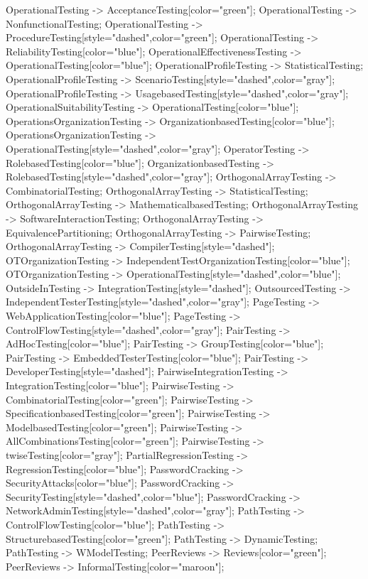 \documentclass{article}
\begin{document}
{OperationalTesting -> AcceptanceTesting[color="green"];
OperationalTesting -> NonfunctionalTesting;
OperationalTesting -> ProcedureTesting[style="dashed",color="green"];
OperationalTesting -> ReliabilityTesting[color="blue"];
OperationalEffectivenessTesting -> OperationalTesting[color="blue"];
OperationalProfileTesting -> StatisticalTesting;
OperationalProfileTesting -> ScenarioTesting[style="dashed",color="gray"];
OperationalProfileTesting -> UsagebasedTesting[style="dashed",color="gray"];
OperationalSuitabilityTesting -> OperationalTesting[color="blue"];
OperationsOrganizationTesting -> OrganizationbasedTesting[color="blue"];
OperationsOrganizationTesting -> OperationalTesting[style="dashed",color="gray"];
OperatorTesting -> RolebasedTesting[color="blue"];
OrganizationbasedTesting -> RolebasedTesting[style="dashed",color="gray"];
OrthogonalArrayTesting -> CombinatorialTesting;
OrthogonalArrayTesting -> StatisticalTesting;
OrthogonalArrayTesting -> MathematicalbasedTesting;
OrthogonalArrayTesting -> SoftwareInteractionTesting;
OrthogonalArrayTesting -> EquivalencePartitioning;
OrthogonalArrayTesting -> PairwiseTesting;
OrthogonalArrayTesting -> CompilerTesting[style="dashed"];
OTOrganizationTesting -> IndependentTestOrganizationTesting[color="blue"];
OTOrganizationTesting -> OperationalTesting[style="dashed",color="blue"];
OutsideInTesting -> IntegrationTesting[style="dashed"];
OutsourcedTesting -> IndependentTesterTesting[style="dashed",color="gray"];
PageTesting -> WebApplicationTesting[color="blue"];
PageTesting -> ControlFlowTesting[style="dashed",color="gray"];
PairTesting -> AdHocTesting[color="blue"];
PairTesting -> GroupTesting[color="blue"];
PairTesting -> EmbeddedTesterTesting[color="blue"];
PairTesting -> DeveloperTesting[style="dashed"];
PairwiseIntegrationTesting -> IntegrationTesting[color="blue"];
PairwiseTesting -> CombinatorialTesting[color="green"];
PairwiseTesting -> SpecificationbasedTesting[color="green"];
PairwiseTesting -> ModelbasedTesting[color="green"];
PairwiseTesting -> AllCombinationsTesting[color="green"];
PairwiseTesting -> twiseTesting[color="gray"];
PartialRegressionTesting -> RegressionTesting[color="blue"];
PasswordCracking -> SecurityAttacks[color="blue"];
PasswordCracking -> SecurityTesting[style="dashed",color="blue"];
PasswordCracking -> NetworkAdminTesting[style="dashed",color="gray"];
PathTesting -> ControlFlowTesting[color="blue"];
PathTesting -> StructurebasedTesting[color="green"];
PathTesting -> DynamicTesting;
PathTesting -> WModelTesting;
PeerReviews -> Reviews[color="green"];
PeerReviews -> InformalTesting[color="maroon"];
}
\end{document}
